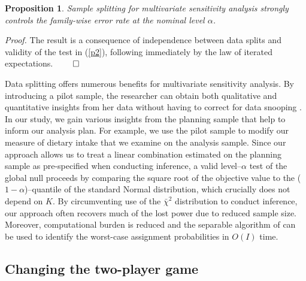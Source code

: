 \documentclass[12pt,leqno,titlepage]{amsart}
\newcommand{\1}{\mathbbm{1}}
\newtheorem{proposition}{Proposition}
\begin{document}
\begin{bibunit}
\begin{proposition}
    \label{validity}
    Sample splitting for multivariate sensitivity analysis strongly controls the family-wise error rate at the nominal level $\alpha$.
\end{proposition}
\textit{Proof.} The result is a consequence of independence between data splits and validity of the test in (\ref{p2}), following immediately by the law of iterated expectations. \hfill $\qed$


Data splitting offers numerous benefits for multivariate sensitivity analysis. By introducing a pilot sample, the researcher can obtain both qualitative and quantitative insights from her data without having to correct for data snooping \citep{tukey1953multiple, tukey1977exploratory}.
In our study, we gain various insights from the planning sample that help to inform our analysis plan. For example, we use the pilot sample to modify our measure of dietary intake that we examine on the analysis sample. 
Since our approach allows us to treat a linear combination estimated on the planning sample as pre-specified when conducting inference, a valid level--$\alpha$ test of the global null proceeds by comparing the square root of the objective value to the ($1-\alpha$)--quantile of the standard Normal distribution, which crucially does not depend on $K$. By circumventing use of the $\bar{\chi}^2$ distribution to conduct  inference, our approach often recovers much of the lost power due to reduced sample size. Moreover, computational burden is reduced and the separable algorithm of \cite{gastwirth2000asymptotic} can be used to identify the worst-case assignment probabilities in $O(I)$ time.




\subsection{Changing the two-player game}\label{subsec:twoplayergame}


\end{bibunit}
\end{document}
